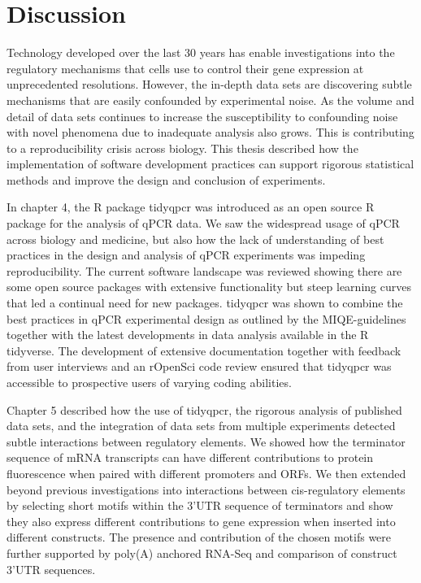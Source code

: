 \documentclass[../main.tex]{subfiles}
\begin{document}
\chapter{{Discussion}}

Technology developed over the last 30 years has enable investigations into the regulatory mechanisms that cells use to control their gene expression at unprecedented resolutions.
However, the in-depth data sets are discovering subtle mechanisms that are easily confounded by experimental noise.
As the volume and detail of data sets continues to increase the susceptibility to confounding noise with novel phenomena  due to inadequate analysis also grows.
This is contributing to a reproducibility crisis across biology.
This thesis described how the implementation of software development practices can support rigorous statistical methods and improve the design and conclusion of experiments.

In chapter 4, the R package tidyqpcr was introduced as an open source R package for the analysis of qPCR data. 
We saw the widespread usage of qPCR across biology and medicine, but also how the lack of understanding of best practices in the design and analysis of qPCR experiments was impeding reproducibility.
The current software landscape was reviewed showing there are some open source packages with extensive functionality but steep learning curves that led a continual need for new packages.
tidyqpcr was shown to combine the best practices in qPCR experimental design as outlined by the MIQE-guidelines together with the latest developments in data analysis available in the R tidyverse.
The development of extensive documentation together with feedback from user interviews and an rOpenSci code review ensured that tidyqpcr was accessible to prospective users of varying coding abilities. 

Chapter 5 described how the use of tidyqpcr, the rigorous analysis of published data sets, and the integration of data sets from multiple experiments detected subtle interactions between regulatory elements.
We showed how the terminator sequence of mRNA transcripts can have different contributions to protein fluorescence when paired with different promoters and ORFs.
We then extended beyond previous investigations into interactions between cis-regulatory elements by selecting short motifs within the 3'UTR sequence of terminators and show they also express different contributions to gene expression when inserted into different constructs.
The presence and contribution of the chosen motifs were further supported by poly(A) anchored RNA-Seq and comparison of construct 3'UTR sequences.
\end{document}
